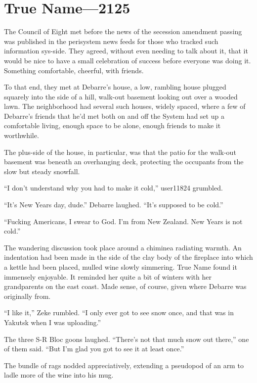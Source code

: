 \hypertarget{true-name-2125}{%
\chapter{True Name—2125}\label{true-name-2125}}

The Council of Eight met before the news of the secession amendment passing was published in the perisystem news feeds for those who tracked such information sys-side. They agreed, without even needing to talk about it, that it would be nice to have a small celebration of success before everyone was doing it. Something comfortable, cheerful, with friends.

To that end, they met at Debarre's house, a low, rambling house plugged squarely into the side of a hill, walk-out basement looking out over a wooded lawn. The neighborhood had several such houses, widely spaced, where a few of Debarre's friends that he'd met both on and off the System had set up a comfortable living, enough space to be alone, enough friends to make it worthwhile.

The plus-side of the house, in particular, was that the patio for the walk-out basement was beneath an overhanging deck, protecting the occupants from the slow but steady snowfall.

``I don't understand why you had to make it cold,'' user11824 grumbled.

``It's New Years day, dude.'' Debarre laughed. ``It's supposed to be cold.''

``Fucking Americans, I swear to God. I'm from New Zealand. New Years is not cold.''

The wandering discussion took place around a chiminea radiating warmth. An indentation had been made in the side of the clay body of the fireplace into which a kettle had been placed, mulled wine slowly simmering. True Name found it immensely enjoyable. It reminded her quite a bit of winters with her grandparents on the east coast. Made sense, of course, given where Debarre was originally from.

``I like it,'' Zeke rumbled. ``I only ever got to see snow once, and that was in Yakutsk when I was uploading.''

The three S-R Bloc goons laughed. ``There's not that much snow out there,'' one of them said. ``But I'm glad you got to see it at least once.''

The bundle of rags nodded appreciatively, extending a pseudopod of an arm to ladle more of the wine into his mug.

